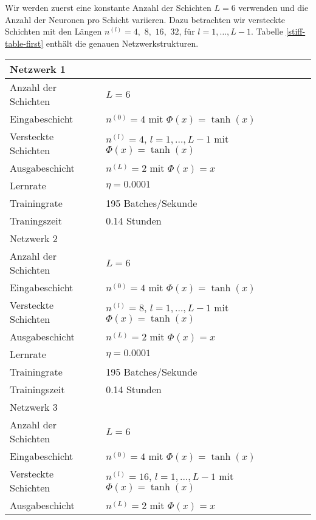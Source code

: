 \clearpage
Wir werden zuerst eine konstante Anzahl der Schichten $L=6$ verwenden und die Anzahl der Neuronen pro Schicht variieren.
Dazu betrachten wir versteckte Schichten mit den Längen
$n^{(l)} = 4,$ $8,$ $16,$ $32$, für $l = 1, \dots, L-1$. Tabelle \ref{stiff-table-first} enthält die genauen
Netzwerkstrukturen.
\begin{table}
       \renewcommand{\arraystretch}{1.0}
       \centering
       \begin{tabular}{ l | l }
              \hline
              Netzwerk 1 & \\
              \hline
              Anzahl der Schichten & $L=6$ \\
              Eingabeschicht & $n^{(0)}=4$ mit $\Phi(x)=\tanh(x)$ \\
              Versteckte Schichten & $n^{(l)}=4$, $l = 1, \dots, L-1$ mit $\Phi(x)=\tanh(x)$ \\
              Ausgabeschicht & $n^{(L)}=2$ mit $\Phi(x)=x$ \\
              Lernrate & $\eta=0.0001$ \\
              Trainingrate & 195 Batches/Sekunde \\
              Traningszeit & 0.14 Stunden \\
              \hline
              Netzwerk 2 & \\
              \hline
              Anzahl der Schichten & $L=6$ \\
              Eingabeschicht & $n^{(0)}=4$ mit $\Phi(x)=\tanh(x)$ \\
              Versteckte Schichten & $n^{(l)}=8$, $l = 1, \dots, L-1$ mit $\Phi(x)=\tanh(x)$ \\
              Ausgabeschicht & $n^{(L)}=2$ mit $\Phi(x)=x$ \\
              Lernrate & $\eta=0.0001$ \\
              Trainingrate & 195 Batches/Sekunde \\
              Trainingszeit & 0.14 Stunden \\
              \hline
              Netzwerk 3 & \\
              \hline
              Anzahl der Schichten & $L=6$ \\
              Eingabeschicht & $n^{(0)}=4$ mit $\Phi(x)=\tanh(x)$ \\
              Versteckte Schichten & $n^{(l)}=16$, $l = 1, \dots, L-1$ mit $\Phi(x)=\tanh(x)$ \\
              Ausgabeschicht & $n^{(L)}=2$ mit $\Phi(x)=x$ \\

\end{tabular}
\end{table}
